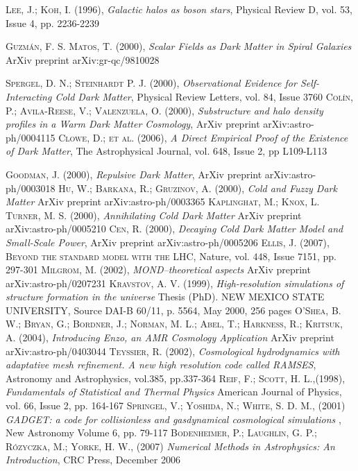 \documentclass[a4paper,openright,12pt]{book}
\begin{document}
\begin{thebibliography}{a}
 \textsc{Lee, J.; Koh, I. (1996)},
\textit{Galactic halos as boson stars},
Physical Review D, vol. 53, Issue 4, pp. 2236-2239

 \textsc{Guzmán, F. S. Matos, T. (2000)},
\textit{Scalar Fields as Dark Matter in Spiral Galaxies}
ArXiv preprint arXiv:gr-qc/9810028

 \textsc{Spergel, D. N.; Steinhardt P. J. (2000)},
\textit{Observational Evidence for Self-Interacting Cold Dark Matter},
Physical Review Letters, vol. 84, Issue 3760
 \textsc{Colín, P.; Avila-Reese, V.; Valenzuela, O. (2000)},
\textit{Substructure and halo density profiles in a Warm Dark Matter Cosmology},
ArXiv preprint arXiv:astro-ph/0004115
 \textsc{Clowe, D.; et al. (2006)},
\textit{A Direct Empirical Proof of the Existence of Dark Matter},
The Astrophysical Journal, vol. 648, Issue 2, pp L109-L113
 
 \textsc{Goodman, J. (2000)},
\textit{Repulsive Dark Matter},
ArXiv preprint arXiv:astro-ph/0003018
 \textsc{Hu, W.; Barkana, R.; Gruzinov, A. (2000)},
\textit{Cold and Fuzzy Dark Matter}
ArXiv preprint arXiv:astro-ph/0003365
 \textsc{Kaplinghat, M.; Knox, L. Turner, M. S. (2000)},
\textit{Annihilating Cold Dark Matter}
ArXiv preprint arXiv:astro-ph/0005210
 \textsc{Cen, R. (2000)},
\textit{Decaying Cold Dark Matter Model and Small-Scale Power},
ArXiv preprint arXiv:astro-ph/0005206
 \textsc{Ellis, J. (2007)},
\textsc{Beyond the standard model with the LHC},
Nature, vol. 448, Issue 7151, pp. 297-301
 \textsc{Milgrom, M. (2002)},
\textit{MOND--theoretical aspects}
ArXiv preprint arXiv:astro-ph/0207231
 \textsc{Kravstov, A. V. (1999)},
\textit{High-resolution simulations of structure formation in the universe}
Thesis (PhD). NEW MEXICO STATE UNIVERSITY, Source DAI-B 60/11, p. 5564, May 2000, 256 pages
 \textsc{O'Shea, B. W.; Bryan, G.; Bordner, J.; Norman, M. L.; Abel, T.; Harkness, R.; Kritsuk, A. (2004)},
\textit{Introducing Enzo, an AMR Cosmology Application}
ArXiv preprint arXiv:astro-ph/0403044
 \textsc{Teyssier, R. (2002)},
\textit{Cosmological hydrodynamics with adaptative mesh refinement. A new high resolution code called RAMSES},
Astronomy and Astrophysics, vol.385, pp.337-364
 \textsc{Reif, F.; Scott, H. L.,(1998)},
\textit{Fundamentals of Statistical and Thermal Physics}
American Journal of Physics, vol. 66, Issue 2, pp. 164-167
 \textsc{Springel, V.; Yoshida, N.; White, S. D. M., (2001)}
\textit{GADGET: a code for collisionless and gasdynamical cosmological simulations },
New Astronomy Volume 6, pp. 79-117
 \textsc{Bodenheimer, P.; Laughlin, G. P.; Rózyczka, M.; Yorke, H. W., (2007)} 
\textit{Numerical Methods in Astrophysics: An Introduction},
CRC Press, December 2006


\end{thebibliography}
\end{document}
